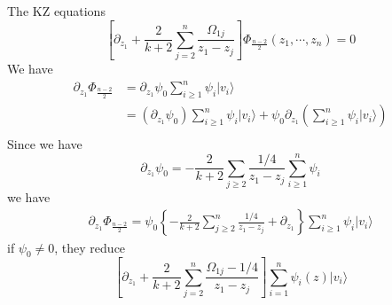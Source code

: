 \subsubsection{}
\subsubsection{}
The KZ equations 
\begin{equation}
	\left[ \partial_{z_1} + \frac{2}{k+2} \sum^n_{j=2} \frac{\Omega_{1j}}{z_1 - z_j} \right] \Phi_{\frac{n-2}{2}} (z_1, \cdots, z_n) =0
\end{equation}
We have 
\begin{equation}
	\begin{split}
	\partial_{z_1} \Phi_{\frac{n-2}{2}} & = \partial_{z_1} \psi_0 \sum_{i\geq 1}^{n} \psi_i |v_i \rangle\\
		& = \left( \partial_{z_1} \psi_0 \right) \sum_{i \geq 1}^n \psi_i |v_i \rangle + \psi_0 \partial_{z_1}\left( \sum_{i \geq 1}^{n} \psi_i |v_i \rangle \right)\\
	\end{split}
\end{equation}
Since we have 
\begin{equation}
\partial_{z_1 } \psi_0 = - \frac{2}{k+2} \sum_{j \geq 2} \frac{1/4}{z_1 -z_j} \sum_{i \geq 1}^n \psi_i
\end{equation}
we have 
\begin{equation}
\begin{split}
 \partial_{z_1} \Phi_{\frac{n-2}{2}} = \psi_0 \left\{ - \frac{2}{k+2} \sum_{j \geq 2}^n \frac{1/4}{z_1 - z_j}  + \partial_{z_1} \right\}\sum_{i \geq 1}^n \psi_i |v_i \rangle
\end{split}
\end{equation}
if $\psi_0 \neq 0$, they reduce
\begin{equation}
\label{eq67}
	\left[ \partial_{z_1} + \frac{2}{k+2} \sum^n_{j=2} \frac{\Omega_{1j}-1/4 }{z_1 - z_j} \right] \sum_{i=1}^{n}\psi_i(z)|v_i \rangle
\end{equation}

